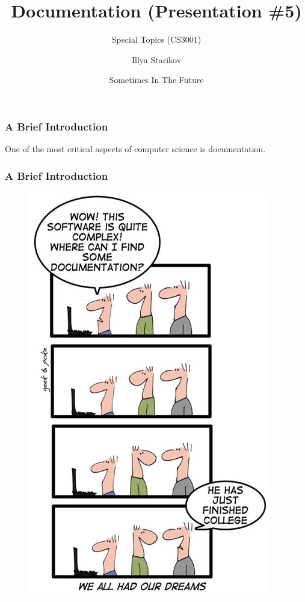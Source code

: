 \documentclass[xclolor=dvipsnames]{beamer}            %
\title{Documentation (Presentation \#5)}
\subtitle{Special Topics (CS3001)}
\author{Illya Starikov}
\date{Sometimes In The Future}
\institute{Missouri University of Science and Technology}
\begin{document}
\begin{darkframes}
    \maketitle

    \begin{frame}
        \frametitle{A Brief Introduction}

        One of the most critical aspects of computer science is documentation.
    \end{frame}

    \begin{frame}
        \frametitle{A Brief Introduction}

        \begin{figure}[H]
            \centering
            \includegraphics[height=0.8\textheight]{assets/documentation-joke.jpg}
            \label{fig:doc-joke}
        \end{figure}
    \end{frame}


\end{darkframes}
\end{document}
